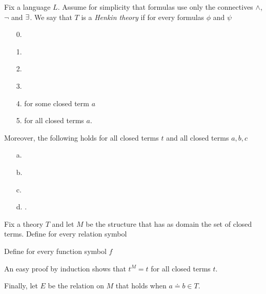 \documentclass[creche.tex]{subfiles}
\begin{document}
\begin{definition}\label{def_Henkin}
Fix a language $L$. Assume for simplicity that formulas use only the connectives $\wedge$, $\neg$ and $\exists$. We say that $T$ is a \emph{Henkin theory\/} if for every formulas $\phi$ and $\psi$

\begin{itemize}
\item[0.]
\item[1.]
\item[2.]
\item[3.]
\item[4.]\quad for some closed term $a$
\item[5.]\quad for all closed terms $a$.
\end{itemize}
Moreover, the following holds for all closed terms $t$ and all closed terms $a, b, c$
\begin{itemize}
\item[a.] 
\item[b.] 
\item[c.] 
\item[d.] .\QED
\end{itemize}
\end{definition}

Fix a theory $T$ and let \emph{$M$} be the structure that has as domain the set of closed terms. Define for every relation symbol


Define for every function symbol $f$


An easy proof by induction shows that $t^M=t$ for all closed terms $t$. 

Finally, let \emph{$E$} be the relation on $M$ that holds when $a{\doteq}b\in T$. 
\end{document}
